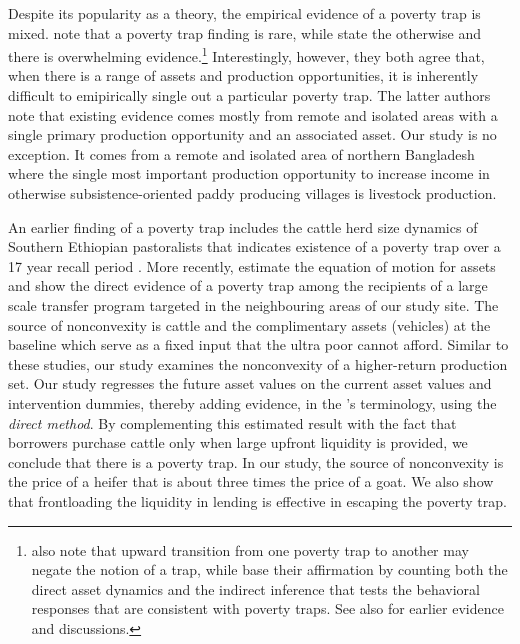 	Despite its popularity as a theory, the empirical evidence of a poverty trap is mixed. \citet{KraayMcKenzie2014} note that a poverty trap finding is rare, while \citet{BarrettGargMcBride2016} state the otherwise and there is overwhelming evidence.\footnote{\citet{KraayMcKenzie2014} also note that upward transition from one poverty trap to another may negate the notion of a trap, while \citet{BarrettGargMcBride2016} base their affirmation by counting both the direct asset dynamics and the indirect inference that tests the behavioral responses that are consistent with poverty traps. See also \citet{CarterBarrett2006, BarrettCarter2013} for earlier evidence and discussions. } Interestingly, however, they both agree that, when there is a range of assets and production opportunities, it is inherently difficult to emipirically single out a particular poverty trap. The latter authors note that existing evidence comes mostly from remote and isolated areas with a single primary production opportunity and an associated asset. Our study is no exception. It comes from a remote and isolated area of northern Bangladesh where the single most important production opportunity to increase income in otherwise subsistence-oriented paddy producing villages is livestock production.  
	
	An earlier finding of a poverty trap includes the cattle herd size dynamics of Southern Ethiopian pastoralists that indicates existence of a poverty trap over a 17 year recall period \citep{Lybbertetal2004}. More recently, \citet{Balboni2020} estimate the equation of motion for assets and show the direct evidence of a poverty trap among the recipients of a large scale transfer program targeted in the neighbouring areas of our study site. The source of nonconvexity is cattle and the complimentary assets (vehicles) at the baseline which serve as a fixed input that the ultra poor cannot afford. Similar to these studies, our study examines the nonconvexity of a higher-return production set. Our study regresses the future asset values on the current asset values and intervention dummies, thereby adding evidence, in the \citet{BarrettGargMcBride2016}'s terminology, using the \textit{direct method}. %
	By complementing this estimated result with the fact that borrowers purchase cattle only when large upfront liquidity is provided, we conclude that there is a poverty trap. In our study, the source of nonconvexity is the price of a heifer that is about three times the price of a goat. We also show that frontloading the liquidity in lending is effective in escaping the poverty trap.

